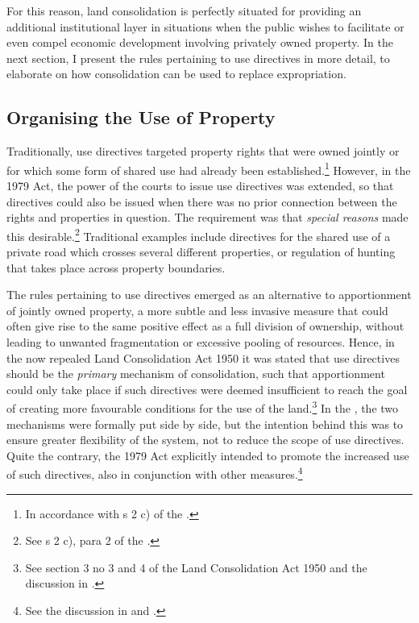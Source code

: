 
For this reason, land consolidation is perfectly situated for providing an additional institutional layer in situations when the public wishes to facilitate or even compel economic development involving privately owned property. In the next section, I present the rules pertaining to use directives in more detail, to elaborate on how consolidation can be used to replace expropriation.

\subsection{Organising the Use of Property}\label{sec:6:3:2}

Traditionally, use directives targeted property rights that were owned jointly or for which some form of shared use had already been established.\footnote{In accordance with s 2 c) of the \cite{lca79}.} However, in the 1979 Act, the power of the courts to issue use directives was extended, so that directives could also be issued when there was no prior connection between the rights and properties in question. The requirement was that \emph{special reasons} made this desirable.\footnote{See s 2 c), para 2 of the \cite{lca79}.} Traditional examples include directives for the shared use of a private road which crosses several different properties, or regulation of hunting that takes place across property boundaries.

The rules pertaining to use directives emerged as an alternative to apportionment of jointly owned property, a more subtle and less invasive measure that could often give rise to the same positive effect as a full division of ownership, without leading to unwanted fragmentation or excessive pooling of resources. Hence, in the now repealed Land Consolidation Act 1950 it was stated that use directives should be the \emph{primary} mechanism of consolidation, such that apportionment could only take place if such directives were deemed insufficient to reach the goal of creating more favourable conditions for the use of the land.\footnote{See section 3 no 3 and 4 of the Land Consolidation Act 1950 and the discussion in \cite[30-37]{nou76}.} In the \cite{lca79}, the two mechanisms were formally put side by side, but the intention behind this was to ensure greater flexibility of the system, not to reduce the scope of use directives. Quite the contrary, the 1979 Act explicitly intended to promote the increased use of such directives, also in conjunction with other measures.\footnote{See the discussion in \cite[35-37]{nou76} and \cite[47-48]{otprp56}.}

